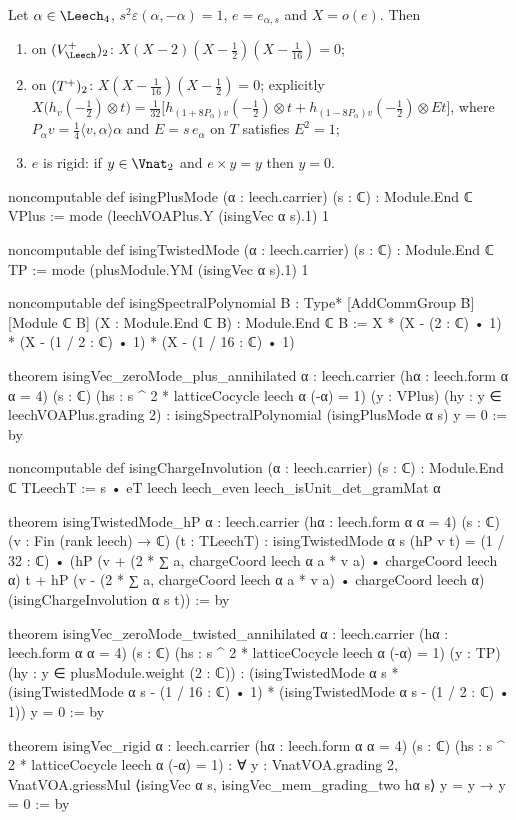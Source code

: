 \begin{theorem}\label{ch20:thm:rigid}
Let $\alpha\in\chtwentyLf$, $s^2\varepsilon(\alpha,-\alpha)=1$, $e=e_{\alpha,s}$ and $X=o(e)$.  Then
\begin{enumerate}[label=(\alph*)]
\item on $(\chtwentyVL)_2$: $X(X-2)(X-\tfrac12)(X-\tfrac1{16})=0$;
\item on $(T^{+})_2$: $X(X-\tfrac1{16})(X-\tfrac12)=0$; explicitly
  $X\bigl(h_v(-\tfrac12)\otimes t\bigr)=\tfrac1{32}\bigl[h_{(1+8P_\alpha)v}(-\tfrac12)\otimes t+h_{(1-8P_\alpha)v}(-\tfrac12)\otimes
  Et\bigr]$, where $P_\alpha v=\tfrac14\langle v,\alpha\rangle\alpha$ and $E=s\,e_\alpha$ on $T$ satisfies $E^2=1$;
\item $e$ is rigid: if $y\in\Vnat_2$ and $e\times y=y$ then $y=0$.
\end{enumerate}
\end{theorem}
\begin{leancode}
noncomputable def isingPlusMode (α : leech.carrier) (s : ℂ) : Module.End ℂ VPlus :=
  mode (leechVOAPlus.Y (isingVec α s).1) 1

noncomputable def isingTwistedMode (α : leech.carrier) (s : ℂ) : Module.End ℂ TP :=
  mode (plusModule.YM (isingVec α s).1) 1

noncomputable def isingSpectralPolynomial {B : Type*} [AddCommGroup B] [Module ℂ B]
    (X : Module.End ℂ B) : Module.End ℂ B :=
  X * (X - (2 : ℂ) • 1) * (X - (1 / 2 : ℂ) • 1) * (X - (1 / 16 : ℂ) • 1)

theorem isingVec_zeroMode_plus_annihilated {α : leech.carrier}
    (hα : leech.form α α = 4) (s : ℂ)
    (hs : s ^ 2 * latticeCocycle leech α (-α) = 1)
    (y : VPlus) (hy : y ∈ leechVOAPlus.grading 2) :
    isingSpectralPolynomial (isingPlusMode α s) y = 0 := by

noncomputable def isingChargeInvolution (α : leech.carrier) (s : ℂ) :
    Module.End ℂ TLeechT := s • eT leech leech_even leech_isUnit_det_gramMat α

theorem isingTwistedMode_hP {α : leech.carrier} (hα : leech.form α α = 4)
    (s : ℂ) (v : Fin (rank leech) → ℂ) (t : TLeechT) :
    isingTwistedMode α s (hP v t) = (1 / 32 : ℂ) •
      (hP (v + (2 * ∑ a, chargeCoord leech α a * v a) • chargeCoord leech α) t +
        hP (v - (2 * ∑ a, chargeCoord leech α a * v a) • chargeCoord leech α)
          (isingChargeInvolution α s t)) := by

theorem isingVec_zeroMode_twisted_annihilated {α : leech.carrier}
    (hα : leech.form α α = 4) (s : ℂ)
    (hs : s ^ 2 * latticeCocycle leech α (-α) = 1)
    (y : TP) (hy : y ∈ plusModule.weight (2 : ℂ)) :
    (isingTwistedMode α s * (isingTwistedMode α s - (1 / 16 : ℂ) • 1) *
      (isingTwistedMode α s - (1 / 2 : ℂ) • 1)) y = 0 := by

theorem isingVec_rigid {α : leech.carrier} (hα : leech.form α α = 4) (s : ℂ)
    (hs : s ^ 2 * latticeCocycle leech α (-α) = 1) :
    ∀ y : VnatVOA.grading 2,
      VnatVOA.griessMul ⟨isingVec α s, isingVec_mem_grading_two hα s⟩ y = y → y = 0 := by
\end{leancode}
